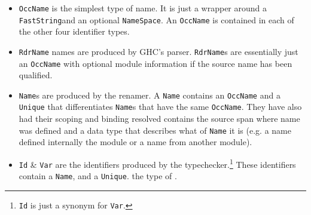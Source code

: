 \begin{itemize}
	\item \texttt{OccName} is the simplest type of name. It is just a wrapper around a \texttt{FastString}\DIFaddbegin {}\DIFaddend and an optional \texttt{NameSpace}. An \texttt{OccName} is contained in each of the other four identifier types. \DIFaddbegin {}\texttt{} \texttt{} \DIFaddend \item \texttt{RdrName} names are produced by GHC's parser. \texttt{RdrName}s are essentially just an \texttt{OccName} with optional module information if the source name has been qualified. 
	\item \texttt{Name}s are produced by the renamer\DIFaddbegin {}\DIFaddend . A \texttt{Name} contains an \texttt{OccName} and a \texttt{Unique} that differentiates \texttt{Name}s that have the same \texttt{OccName}. \DIFaddbegin {}\texttt{} \DIFaddend They have also had their scoping and binding resolved\DIFdelbegin {}\DIFdelend \DIFaddbegin {}\texttt{} \DIFaddend contains the source span where \DIFdelbegin {}\DIFdelend \DIFaddbegin {}\DIFaddend name was defined and a data type that describes what \DIFdelbegin {}\DIFdelend \DIFaddbegin {}\DIFaddend of \texttt{Name} it is (e.g. a name defined internally \DIFdelbegin {}\DIFdelend \DIFaddbegin {}\DIFaddend the module or a name from another module).
	\item \texttt{Id} \& \texttt{Var} are the identifiers produced by the typechecker.\footnote{\texttt{Id} is just a synonym for \texttt{Var}.} These identifiers contain a \texttt{Name}, and a \texttt{Unique}. \DIFdelbegin {}\DIFdelend \DIFaddbegin {}\DIFaddend the type of \DIFdelbegin \texttt{}%
\texttt{} %
\DIFdelend \DIFaddbegin {}\DIFaddend . 
\end{itemize}

